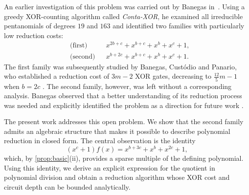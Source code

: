 \documentclass{ieeeaccess}
\theoremstyle{plain}
\theoremstyle{definition}
\begin{document}
An earlier investigation of this problem was carried out by Banegas 
in~\cite{Banegas2015}. Using a greedy XOR-counting algorithm 
called \emph{Conta-XOR}, he examined all irreducible pentanomials of
degrees $19$ and $163$ and identified two families with particularly low
reduction costs:
\begin{align*}
&\text{(first)} &&
x^{2b+c}+x^{b+c}+x^b+x^c+1,\\
&\text{(second)} &&
x^{b+2c}+x^{b+c}+x^b+x^c+1.
\end{align*}
The first family was subsequently studied by Banegas, Custódio and Panario, who
established a reduction cost of $3m-2$ XOR gates, decreasing to
$\tfrac{12}{5}m-1$ when $b=2c$ \cite{BCP2019}. The second family, however, was
left without a corresponding analysis. Banegas observed that a better
understanding of its reduction process was needed and explicitly identified the
problem as a direction for future work \cite[Sec.~4.5]{Banegas2015}.

The present work addresses this open problem. We show that the second family
admits an algebraic structure that makes it possible to describe polynomial
reduction in closed form. The central observation is the identity
\[
(x^c+1)f(x)=x^{b+3c}+x^b+x^{2c}+1,
\]
which, by \cref{prop:basic}(ii), provides a sparse multiple of the defining polynomial. Using this
identity, we derive an explicit expression for the quotient in polynomial
division and obtain a reduction algorithm whose XOR cost and circuit depth can
be bounded analytically.
\end{document}
